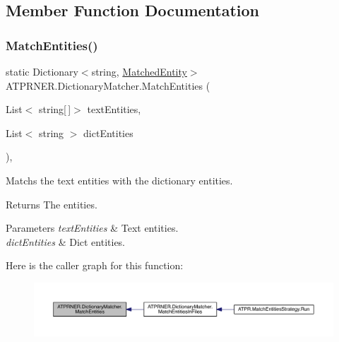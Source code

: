 \subsection{Member Function Documentation}
\hypertarget{class_a_t_p_r_n_e_r_1_1_dictionary_matcher_aa6fdeaf3a88c14b5ed8e4f452d1c3c17}{}\label{class_a_t_p_r_n_e_r_1_1_dictionary_matcher_aa6fdeaf3a88c14b5ed8e4f452d1c3c17} 
\subsubsection{\texorpdfstring{Match\+Entities()}{MatchEntities()}}
{\footnotesize\ttfamily static Dictionary$<$string, \hyperlink{class_a_t_p_r_n_e_r_1_1_matched_entity}{Matched\+Entity}$>$ A\+T\+P\+R\+N\+E\+R.\+Dictionary\+Matcher.\+Match\+Entities (\begin{DoxyParamCaption}\item[{List$<$ string\mbox{[}$\,$\mbox{]}$>$}]{text\+Entities,  }\item[{List$<$ string $>$}]{dict\+Entities }\end{DoxyParamCaption})\hspace{0.3cm}{\ttfamily [inline]}, {\ttfamily [static]}}



Matchs the text entities with the dictionary entities. 

\begin{DoxyReturn}{Returns}
The entities.
\end{DoxyReturn}

\begin{DoxyParams}{Parameters}
{\em text\+Entities} & Text entities.\\
\hline
{\em dict\+Entities} & Dict entities.\\
\hline
\end{DoxyParams}
Here is the caller graph for this function\+:
\nopagebreak
\begin{figure}[H]
\begin{center}
\leavevmode
\includegraphics[width=350pt]{d0/d6a/class_a_t_p_r_n_e_r_1_1_dictionary_matcher_aa6fdeaf3a88c14b5ed8e4f452d1c3c17_icgraph}
\end{center}
\end{figure}
\hypertarget{class_a_t_p_r_n_e_r_1_1_dictionary_matcher_a6fc36cbd0e0df420c2aaafa389ae7b61}{}\label{class_a_t_p_r_n_e_r_1_1_dictionary_matcher_a6fc36cbd0e0df420c2aaafa389ae7b61} 
